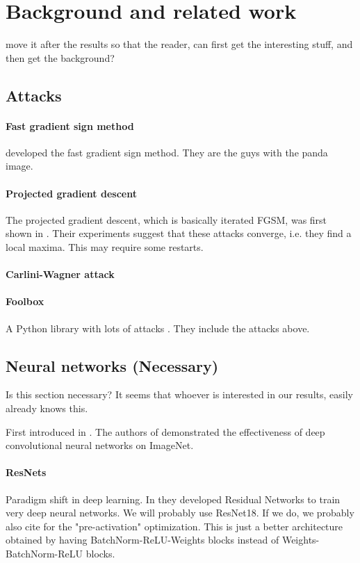 \documentclass{article}
\begin{document}
\section{Background and related work}

move it after the results so that the reader, can first get the interesting stuff, and then get the background?

\subsection{Attacks}

\paragraph{Fast gradient sign method}
\cite{goodfellow2014explaining} developed the fast gradient sign method. They are the guys with the panda image.

\paragraph{Projected gradient descent}
The projected gradient descent, which is basically iterated FGSM, was first shown in \cite{madry2017towards}. Their experiments suggest that these attacks converge, i.e. they find a local maxima. This may require some restarts.

\paragraph{Carlini-Wagner attack}


\paragraph{Foolbox}
A Python library with lots of attacks \cite{rauber2017foolbox}. They include the attacks above.

\subsection{Neural networks (Necessary)}
Is this section necessary? It seems that whoever is interested in our results, easily already knows this.

First introduced in \cite{lecun1999object}. The authors of
\cite{krizhevsky2012imagenet} demonstrated the effectiveness of deep convolutional neural networks on ImageNet.

\paragraph{ResNets}
Paradigm shift in deep learning. In \cite{he2016deep} they developed Residual Networks to train very deep neural networks. We will probably use ResNet18. If we do, we probably also cite \cite{he2016identity} for the "pre-activation" optimization. This is just a better architecture obtained by having BatchNorm-ReLU-Weights blocks instead of Weights-BatchNorm-ReLU blocks.
\end{document}

